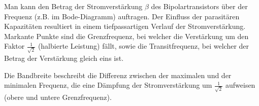 Man kann den Betrag der Stromverstärkung $\beta$ des Bipolartransistors über der
Frequenz (z.B. im Bode-Diagramm) auftragen. Der Einfluss der parasitären
Kapazitäten resultiert in einem tiefpassartigen Verlauf der Stromverstärkung.
Markante Punkte sind die Grenzfrequenz, bei welcher die Verstärkung um den
Faktor $\frac{1}{\sqrt{2}}$ (halbierte Leistung) fällt, sowie die
Transitfrequenz, bei welcher der Betrag der Verstärkung gleich eins ist.

Die Bandbreite beschreibt die Differenz zwischen der maximalen und der
minimalen Frequenz, die eine Dämpfung der Stromverstärkung um
$\frac{1}{\sqrt{2}}$ aufweisen (obere und untere Grenzfrequenz).